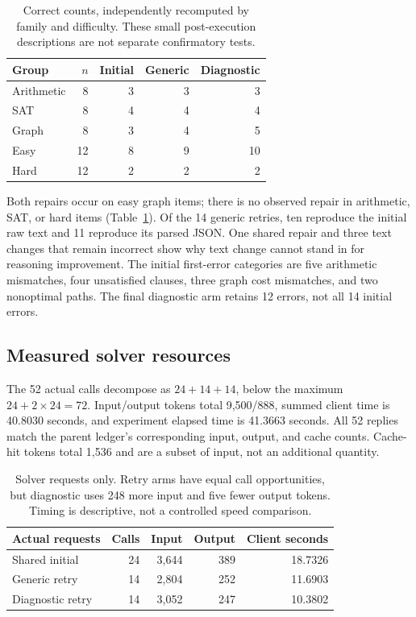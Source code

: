 \begin{table}[t]
\centering
\begin{tabular}{lrrrr}
\toprule
Group & $n$ & Initial & Generic & Diagnostic\\
\midrule
Arithmetic & 8 & 3 & 3 & 3\\
SAT & 8 & 4 & 4 & 4\\
Graph & 8 & 3 & 4 & 5\\
\midrule
Easy & 12 & 8 & 9 & 10\\
Hard & 12 & 2 & 2 & 2\\
\bottomrule
\end{tabular}
\caption{Correct counts, independently recomputed by family and difficulty. These small post-execution descriptions are not separate confirmatory tests.}
\label{tab:groups}
\end{table}

Both repairs occur on easy graph items; there is no observed repair in arithmetic, SAT, or hard items (Table~\ref{tab:groups}). Of the 14 generic retries, ten reproduce the initial raw text and 11 reproduce its parsed JSON. One shared repair and three text changes that remain incorrect show why text change cannot stand in for reasoning improvement. The initial first-error categories are five arithmetic mismatches, four unsatisfied clauses, three graph cost mismatches, and two nonoptimal paths. The final diagnostic arm retains 12 errors, not all 14 initial errors.

\subsection{Measured solver resources}
The 52 actual calls decompose as $24+14+14$, below the maximum $24+2\times24=72$. Input/output tokens total 9,500/888, summed client time is 40.8030 seconds, and experiment elapsed time is 41.3663 seconds. All 52 replies match the parent ledger's corresponding input, output, and cache counts. Cache-hit tokens total 1,536 and are a subset of input, not an additional quantity.

\begin{table}[t]
\centering
\begin{tabular}{lrrrr}
\toprule
Actual requests & Calls & Input & Output & Client seconds\\
\midrule
Shared initial & 24 & 3,644 & 389 & 18.7326\\
Generic retry & 14 & 2,804 & 252 & 11.6903\\
Diagnostic retry & 14 & 3,052 & 247 & 10.3802\\
\bottomrule
\end{tabular}
\caption{Solver requests only. Retry arms have equal call opportunities, but diagnostic uses 248 more input and five fewer output tokens. Timing is descriptive, not a controlled speed comparison.}
\label{tab:resources}
\end{table}

